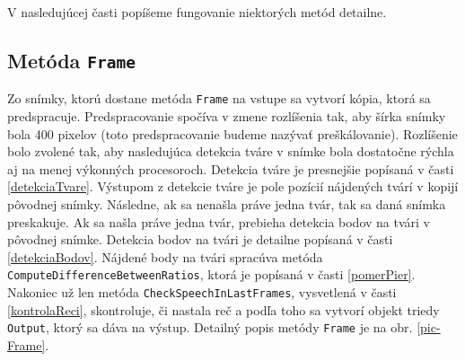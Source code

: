 V nasledujúcej časti popíšeme fungovanie niektorých metód detailne.

\subsection{Metóda \texttt{Frame}}
Zo snímky, ktorú dostane metóda \texttt{Frame} na vstupe sa vytvorí kópia, ktorá sa predspracuje.
Predspracovanie spočíva v zmene rozlíšenia tak, aby šírka snímky bola  400 pixelov (toto predspracovanie budeme nazývať preškálovanie).
Rozlíšenie bolo zvolené tak, aby nasledujúca detekcia tváre v snímke bola dostatočne rýchla aj na menej výkonných procesoroch.
Detekcia tváre je presnejšie popísaná v časti \ref{detekciaTvare}.
Výstupom z detekcie tváre je pole pozícií nájdených tvárí v kopijí pôvodnej snímky. 
Následne, ak sa nenašla práve jedna tvár, tak sa daná snímka preskakuje. 
Ak sa našla práve jedna tvár, prebieha detekcia bodov na tvári v pôvodnej snímke. 
Detekcia bodov na tvári je detailne popísaná v časti \ref{detekciaBodov}.
Nájdené body na tvári spracúva metóda \texttt{ComputeDifferenceBetweenRatios}, ktorá je popísaná v časti \ref{pomerPier}.
Nakoniec už len metóda \texttt{CheckSpeechInLastFrames}, vysvetlená v časti  \ref{kontrolaReci}, skontroluje, či nastala reč a podľa toho sa vytvorí objekt triedy \texttt{Output}, ktorý sa dáva na výstup. 
Detailný popis metódy \texttt{Frame} je na obr. \ref{pic-Frame}.

